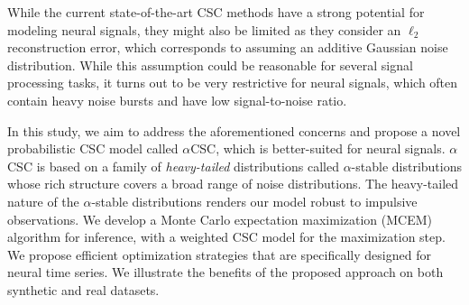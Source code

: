 




While the current state-of-the-art \ac{CSC} methods have a strong potential for modeling neural signals, they might also be limited as they consider an $\ell_2$ reconstruction error, which corresponds to assuming an additive Gaussian noise distribution. While this assumption could be reasonable for several signal processing tasks, it turns out to be very restrictive for neural signals, which often contain heavy noise bursts and have low signal-to-noise ratio.

%

In this study, we aim to address the aforementioned concerns and propose a novel probabilistic \ac{CSC} model called $\alpha$CSC, which is better-suited for neural signals. $\alpha$CSC is based on a family of \emph{heavy-tailed} distributions called $\alpha$-stable distributions \citep{samorodnitsky1994stable} whose rich structure covers a broad range of noise distributions. The heavy-tailed nature of the $\alpha$-stable distributions renders our model robust to impulsive observations. We develop a Monte Carlo expectation maximization (MCEM) algorithm for inference, with a weighted \ac{CSC} model for the maximization step. We propose efficient optimization strategies that are specifically designed for neural time series.
%
We illustrate the benefits of the proposed approach on both synthetic and real datasets.

